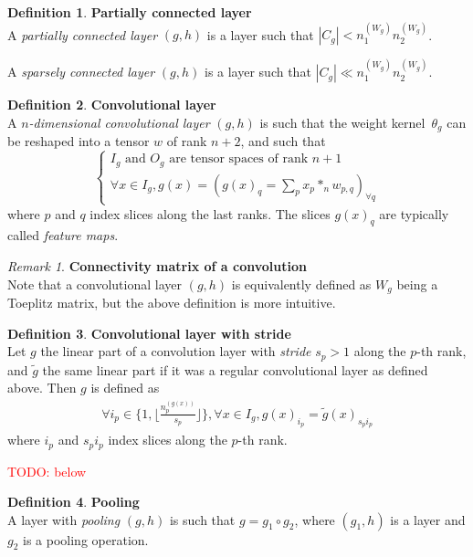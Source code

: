 \documentclass{article}
\theoremstyle{definition}
\newtheorem{definition}{Definition}[section]
\theoremstyle{remark}
\newtheorem{remark}{Remark}
\theoremstyle{plain}
\newcommand{\todo}[1]{\textcolor{red}{TODO: #1\\}}
\begin{document}
\begin{definition}\textbf{Partially connected layer}\\
A \textit{partially connected layer} $(g,h)$ is a layer such that $|C_g| < n_1^{(W_g)} n_2^{(W_g)}$.

A \textit{sparsely connected layer} $(g,h)$ is a layer such that $|C_g| \ll n_1^{(W_g)} n_2^{(W_g)}$.
\end{definition}

\begin{definition}\textbf{Convolutional layer}\\
A \textit{$n$-dimensional convolutional layer} $(g,h)$ is such that the weight kernel~$\theta_g$ can be reshaped into a tensor $w$ of rank $n+2$, and such that
$$
\left\{
\begin{array}{l}
  I_g \mbox{ and } O_g \mbox{ are tensor spaces of rank }n+1 \\
  \forall x \in I_g, g(x) = (g(x)_q = \sum\limits_p{x_p \ast_n w_{p,q}})_{\forall q}
\end{array}
\right.
$$
where $p$ and $q$ index slices along the last ranks. The slices $g(x)_q$ are typically called \textit{feature maps}.
\end{definition}

\begin{remark}\textbf{Connectivity matrix of a convolution}\\
Note that a convolutional layer $(g,h)$ is equivalently defined as $W_g$ being a Toeplitz matrix, but the above definition is more intuitive.
\end{remark}

\begin{definition}\textbf{Convolutional layer with stride}\\
Let $g$ the linear part of a convolution layer with \emph{stride} $s_p > 1$ along the $p$-th rank, and $\widetilde{g}$ the same linear part if it was a regular convolutional layer as defined above. Then $g$ is defined as
\begin{gather*}
  \forall i_p \in \{ 1, \lfloor \frac{n_p^{(g(x))}}{s_p} \rfloor \}, \forall x \in I_g, g(x)_{i_p} = \widetilde{g}(x)_{s_p i_p}
\end{gather*}
where $i_p$ and $s_p i_p$ index slices along the $p$-th rank.
\end{definition}

\todo{below}

\begin{definition}\textbf{Pooling}\\
A layer with \textit{pooling} $(g,h)$ is such that $g = g_1 \circ g_2$, where $(g_1,h)$ is a layer and $g_2$ is a pooling operation.

\end{definition}
\end{document}
